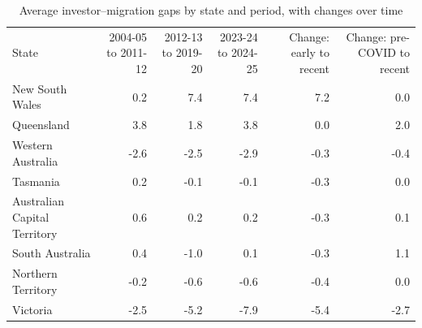 \documentclass[
  11pt,
  a4paper,
]{article}
\begin{document}
\begin{longtable}[t]{lrrrrr}

\caption{\label{tbl-app-q3-change-values}Average investor--migration
gaps by state and period, with changes over time}

\tabularnewline

\\
\toprule
State & 2004-05 to 2011-12 & 2012-13 to 2019-20 & 2023-24 to 2024-25 & Change: early to recent & Change: pre-COVID to recent\\
\midrule
New South Wales & 0.2 & 7.4 & 7.4 & 7.2 & 0.0\\
Queensland & 3.8 & 1.8 & 3.8 & 0.0 & 2.0\\
Western Australia & -2.6 & -2.5 & -2.9 & -0.3 & -0.4\\
Tasmania & 0.2 & -0.1 & -0.1 & -0.3 & 0.0\\
Australian Capital Territory & 0.6 & 0.2 & 0.2 & -0.3 & 0.1\\
\addlinespace
South Australia & 0.4 & -1.0 & 0.1 & -0.3 & 1.1\\
Northern Territory & -0.2 & -0.6 & -0.6 & -0.4 & 0.0\\
Victoria & -2.5 & -5.2 & -7.9 & -5.4 & -2.7\\
\bottomrule

\end{longtable}
\end{document}
